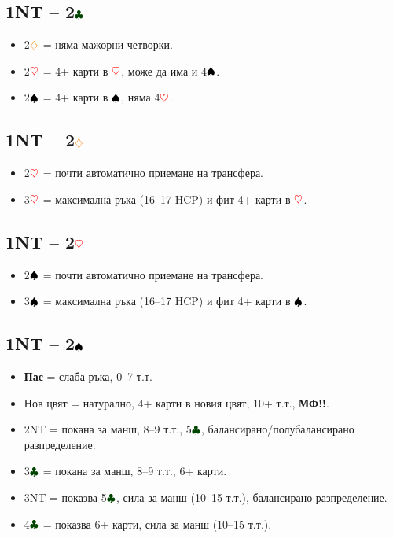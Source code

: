 \documentclass[10pt,a5paper]{extarticle}
\newcommand{\Rheart}{\textcolor{red}{\heartsuit}}
\newcommand{\Rdiamond}{\textcolor{orange}{\diamondsuit}}
\newcommand{\Bspade}{\textcolor{black}{\spadesuit}}
\newcommand{\Bclub}{\textcolor{darkgreen}{\clubsuit}}
\begin{document}
\subsection{1NT – 2$\Bclub$}
\begin{itemize}
  \item[] 2$\Rdiamond$ = няма мажорни четворки.
  \item[] 2$\Rheart$ = 4+ карти в $\Rheart$, може да има и 4$\Bspade$.
  \item[] 2$\Bspade$ = 4+ карти в $\Bspade$, няма 4$\Rheart$.
\end{itemize}

\subsection{1NT – 2$\Rdiamond$}
\begin{itemize}
  \item[] 2$\Rheart$ = почти автоматично приемане на трансфера.
  \item[] 3$\Rheart$ = максимална ръка (16–17 HCP) и фит 4+ карти в $\Rheart$.
\end{itemize}

\subsection{1NT – 2$\Rheart$}
\begin{itemize}
  \item[] 2$\Bspade$ = почти автоматично приемане на трансфера.
  \item[] 3$\Bspade$ = максимална ръка (16–17 HCP) и фит 4+ карти в $\Bspade$.
\end{itemize}

\subsection{1NT – 2$\Bspade$}
\begin{itemize}
  \item[] \textbf{Пас} = слаба ръка, 0–7 т.т.
  \item[] Нов цвят = натурално, 4+ карти в новия цвят, 10+ т.т., \textbf{МФ!!}.
  \item[] 2NT = покана за манш, 8–9 т.т., 5$\Bclub$, балансирано/полубалансирано разпределение.
  \item[] 3$\Bclub$ = покана за манш, 8–9 т.т., 6+ карти.
  \item[] 3NT = показва 5$\Bclub$, сила за манш (10–15 т.т.), балансирано разпределение.
  \item[] 4$\Bclub$ = показва 6+ карти, сила за манш (10–15 т.т.).
\end{itemize}
\newpage
\end{document}
